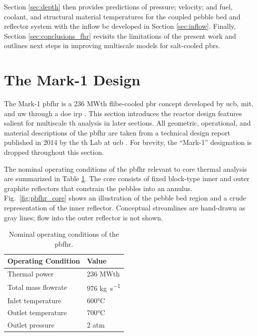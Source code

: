 Section \ref{sec:depth} then provides predictions of pressure; velocity; and fuel, coolant, and structural material temperatures for the coupled pebble bed and reflector system with the inflow \gls{bc} developed in Section \ref{sec:inflow}. Finally, Section \ref{sec:conclusions_fhr} revisits the limitations of the present work and outlines next steps in improving multiscale models for salt-cooled \glspl{pbr}.

\section{The Mark-1 Design}
\label{sec:mark1}

The Mark-1 \gls{pbfhr} is a 236 MWth \gls{flibe}-cooled \gls{pbr} concept developed by \gls{ucb}, \gls{mit}, and \gls{uw} through a \gls{doe} \gls{irp} \cite{pbfhr}. This section introduces the reactor design features salient for multiscale \gls{th} analysis in later sections. All geometric, operational, and material descriptions of the \gls{pbfhr} are taken from a technical design report published in 2014 by the \gls{th} Lab at \gls{ucb} \cite{pbfhr}. For brevity, the ``Mark-1'' designation is dropped throughout this section.

The nominal operating conditions of the \gls{pbfhr} relevant to core thermal analysis are summarized in Table \ref{table:operating}. The core consists of fixed block-type inner and outer graphite reflectors that constrain the pebbles into an annulus. Fig.\ \ref{fig:pbfhr_core} shows an illustration of the pebble bed region and a crude representation of the inner reflector. Conceptual streamlines are hand-drawn as gray lines; flow into the outer reflector is not shown.

\begin{table}[htb!]
\caption{Nominal operating conditions of the \gls{pbfhr}.}
\centering
\begin{tabular}{@{}ll@{}}
\toprule
\textbf{Operating Condition} & \textbf{Value}\\
\midrule
Thermal power & 236 MWth\\
Total mass flowrate & 976 \si{\kilo\gram\per\second}\\
Inlet temperature & 600\si{\celsius}\\
Outlet temperature & 700\si{\celsius}\\
Outlet pressure & 2 atm\\
\bottomrule
\end{tabular}
\label{table:operating}
\end{table}

